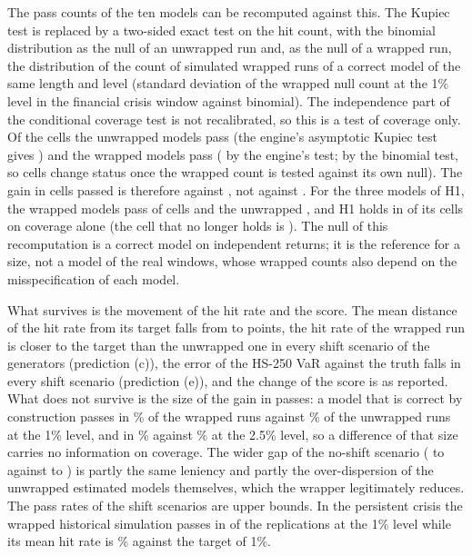 The pass counts of the ten models can be recomputed against this. The Kupiec test is replaced by a two-sided exact test on the hit count, with the binomial distribution as the null of an unwrapped run and, as the null of a wrapped run, the distribution of the count of \dispCNullReps{} simulated wrapped runs of a correct model of the same length and level (standard deviation of the wrapped null count \dispCNullSdEqCrisisOne{} at the 1\% level in the financial crisis window against \dispCBinSdEqCrisisOne{} binomial). The independence part of the conditional coverage test is not recalibrated, so this is a test of coverage only. Of the \dispCCells{} cells the unwrapped models pass \dispCUnwExact{} (the engine's asymptotic Kupiec test gives \dispCUnwAsy{}) and the wrapped models pass \dispCWrapCal{} (\dispCWrapAsy{} by the engine's test; \dispCWrapExact{} by the binomial test, so \dispCFlips{} cells change status once the wrapped count is tested against its own null). The gain in cells passed is therefore \dispCWrapCal{} against \dispCUnwExact{}, not \tenPassAci{} against \tenPassUnw{}. For the three models of H1, the wrapped models pass \dispCHoneWrap{} of \dispCHoneCells{} cells and the unwrapped \dispCHoneUnw{}, and H1 holds in \dispCHoneGainCal{} of its \hypCells{} cells on coverage alone (the cell that no longer holds is \dispCHoneLost). The null of this recomputation is a correct model on independent returns; it is the reference for a size, not a model of the real windows, whose wrapped counts also depend on the misspecification of each model.

What survives is the movement of the hit rate and the score. The mean distance of the hit rate from its target falls from \tenHitDevUnw{} to \tenHitDevAci{} points, the hit rate of the wrapped run is closer to the target than the unwrapped one in every shift scenario of the generators (prediction (c)), the error of the HS-250 VaR against the truth falls in every shift scenario (prediction (e)), and the change of the score is as reported. What does not survive is the size of the gain in passes: a model that is correct by construction passes in \dispBOneOneAciPass\% of the wrapped runs against \dispBOneOneUnwPass\% of the unwrapped runs at the 1\% level, and in \dispBTwoHalfOneAciPass\% against \dispBTwoHalfOneUnwPass\% at the 2.5\% level, so a difference of that size carries no information on coverage. The wider gap of the no-shift scenario (\dispNullPassAciMin{} to \dispNullPassAciMax{} against \dispNullPassUnwMin{} to \dispNullPassUnwMax{}) is partly the same leniency and partly the over-dispersion of the unwrapped estimated models themselves, which the wrapper legitimately reduces. The pass rates of the shift scenarios are upper bounds. In the persistent crisis the wrapped historical simulation passes in \genPassCrisisHsTwoFiftyOneAci{} of the replications at the 1\% level while its mean hit rate is \genHitCrisisHsTwoFiftyOneAci\% against the target of 1\%.
